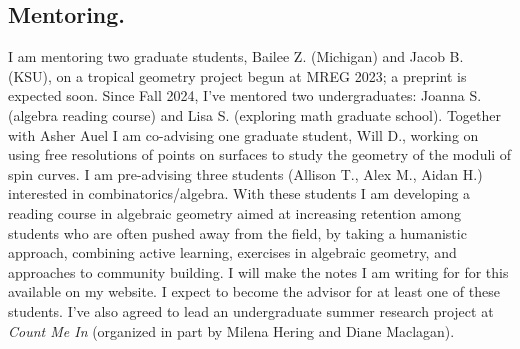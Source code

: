 \documentclass[11pt,reqno]{amsart}
\theoremstyle{remark}
\begin{document}
\subsection{Mentoring.} I am mentoring two graduate students, Bailee Z. (Michigan) and Jacob B. (KSU), on a tropical geometry project begun at MREG 2023; a preprint is expected soon. Since Fall 2024, I’ve mentored two undergraduates: Joanna S. (algebra reading course) and Lisa S. (exploring math graduate school). Together with Asher Auel I am co-advising one graduate student, Will D., working on using free resolutions of points on surfaces to study the geometry of the moduli of spin curves. I am pre-advising three students (Allison T., Alex M., Aidan H.) interested in combinatorics/algebra. With these students I am developing a reading course in algebraic geometry aimed at increasing retention among students who are often pushed away from the field, by taking a humanistic approach, combining active learning, exercises in algebraic geometry, and approaches to community building. I will make the notes I am writing for for this available on my website. I expect to become the advisor for at least one of these students.  I’ve also agreed to lead an undergraduate summer research project at \textit{Count Me In} (organized in part by Milena Hering and Diane Maclagan).


\newpage
\renewcommand{\bibliofont}{\normalsize}



\end{document}
